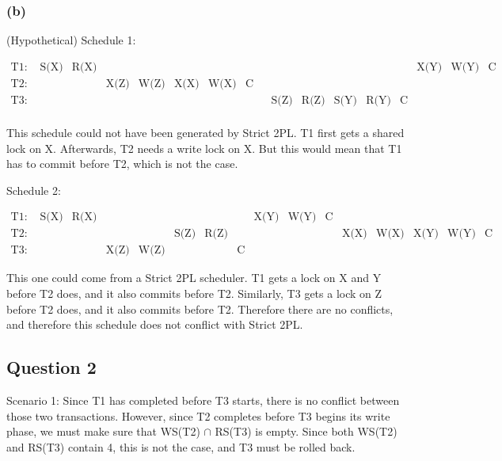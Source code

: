 \documentclass[12pt,a4paper]{article}
\begin{document}
\subsubsection*{(b)}
(Hypothetical) Schedule 1:

\begin{align*}
  \text{T1: } & \text{S(X)} & \text{R(X)} &  & & & & & & & & & & & \text{X(Y)} & \text{W(Y)} & \text{C}\\
  \text{T2: } & & & \text{X(Z)} & \text{W(Z)} & \text{X(X)} & \text{W(X)} & \text{C} & & & & & & & & \\
  \text{T3: } & & & & & & & & &  \text{S(Z)} & \text{R(Z)} & \text{S(Y)} & \text{R(Y)} & \text{C} & & & \\
\end{align*} 

This schedule could not have been generated by Strict 2PL. T1 first gets a shared lock on X. Afterwards, T2 needs a write lock on X. But this would mean that T1 has to commit before T2, which is not the case.

Schedule 2: 

\begin{align*}
  \text{T1: } & \text{S(X)} & \text{R(X)} & & & & & & \text{X(Y)} & \text{W(Y)} & \text{C} & & & & & \\
  \text{T2: } & & & & & \text{S(Z)} & \text{R(Z)} & & & & & \text{X(X)} & \text{W(X)} & \text{X(Y)} & \text{W(Y)} & \text{C} \\
  \text{T3: } & & & \text{X(Z)} & \text{W(Z)} & & & \text{C} & & & & & & & &  
\end{align*}

This one could come from a Strict 2PL scheduler. T1 gets a lock on X and Y before T2 does, and it also commits before T2. Similarly, T3 gets a lock on Z before T2 does, and it also commits before T2. Therefore there are no conflicts, and therefore this schedule does not conflict with Strict 2PL.



\subsection*{Question 2}
\label{sec:eq2}

Scenario 1:
Since T1 has completed before T3 starts, there is no conflict between those two transactions. However, since T2 completes before T3 begins its write phase, we must make sure that WS(T2) $\cap$ RS(T3) is empty. Since both WS(T2) and RS(T3) contain 4, this is not the case, and T3 must be rolled back.
\end{document}
